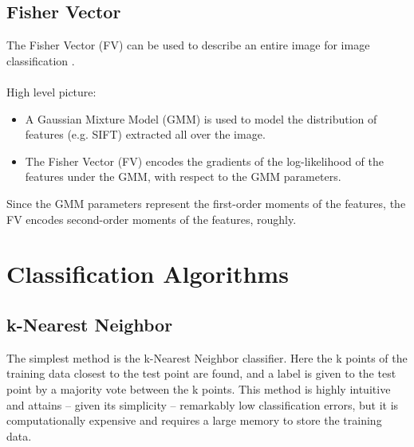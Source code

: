 \documentclass[12pt]{article}
\numberwithin{equation}{section}
\numberwithin{table}{section}
\numberwithin{figure}{section}
\begin{document}
\cite{Singh2012}

\subsection{Fisher Vector} \label{fv}



The Fisher Vector (FV) can be used to describe an entire image for image classification \cite{Sanchez2013}. \\\\High level picture:

\begin{itemize}
	\item A Gaussian Mixture Model (GMM) is used to model the distribution of features (e.g. SIFT) extracted all over the image.
	\item The Fisher Vector (FV) encodes the gradients of the log-likelihood of the features under the GMM, with respect to the GMM parameters.
\end{itemize}

\noindent
Since the GMM parameters represent the first-order moments of the features, the FV encodes second-order moments of the features, roughly.










\section{Classification Algorithms} \label{classalgs}

\subsection{k-Nearest Neighbor } \label{knn}
The simplest method is the k-Nearest Neighbor classifier. Here the k points of the training data closest to the test point are found, and a label is given to the test point by a majority vote between the k points. This method is highly intuitive and attains – given its simplicity – remarkably low classification errors, but it is computationally expensive and requires a large memory to store the training data.
\end{document}
